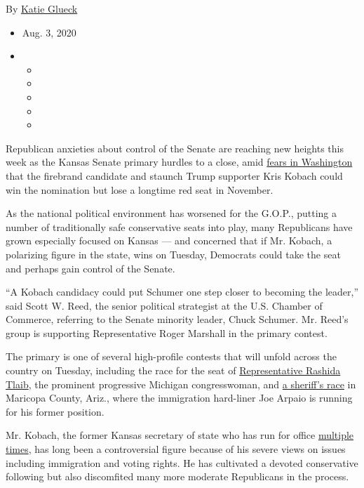 By \href{https://www.nytimes3xbfgragh.onion/by/katie-glueck}{Katie
Glueck}

\begin{itemize}
\item
  Aug. 3, 2020
\item
  \begin{itemize}
  \item
  \item
  \item
  \item
  \item
  \end{itemize}
\end{itemize}

Republican anxieties about control of the Senate are reaching new
heights this week as the Kansas Senate primary hurdles to a close, amid
\href{https://www.nytimes3xbfgragh.onion/2020/07/30/us/politics/kansas-senate-kobach-trump.html}{fears
in Washington} that the firebrand candidate and staunch Trump supporter
Kris Kobach could win the nomination but lose a longtime red seat in
November.

As the national political environment has worsened for the G.O.P.,
putting a number of traditionally safe conservative seats into play,
many Republicans have grown especially focused on Kansas --- and
concerned that if Mr. Kobach, a polarizing figure in the state, wins on
Tuesday, Democrats could take the seat and perhaps gain control of the
Senate.

``A Kobach candidacy could put Schumer one step closer to becoming the
leader,'' said Scott W. Reed, the senior political strategist at the
U.S. Chamber of Commerce, referring to the Senate minority leader, Chuck
Schumer. Mr. Reed's group is supporting Representative Roger Marshall in
the primary contest.

The primary is one of several high-profile contests that will unfold
across the country on Tuesday, including the race for the seat of
\href{https://www.nytimes3xbfgragh.onion/2020/07/18/us/rashida-tlaib-brenda-jones-primary.html}{Representative
Rashida Tlaib}, the prominent progressive Michigan congresswoman, and
\href{https://www.nytimes3xbfgragh.onion/2020/08/02/us/politics/arizona-election-joe-arpaio.html}{a
sheriff's race} in Maricopa County, Ariz., where the immigration
hard-liner Joe Arpaio is running for his former position.

Mr. Kobach, the former Kansas secretary of state who has run for office
\href{https://www.nytimes3xbfgragh.onion/2017/06/13/magazine/the-man-behind-trumps-voter-fraud-obsession.html}{multiple
times}, has long been a controversial figure because of his severe views
on issues including immigration and voting rights. He has cultivated a
devoted conservative following but also discomfited many more moderate
Republicans in the process.

